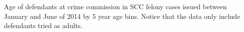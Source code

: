 Age of defendants at crime commission in SCC felony cases issued between January and June of 2014 by 5 year age bins. Notice that the data only include defendants tried as adults.
\label{fig:AgeBreakdown}